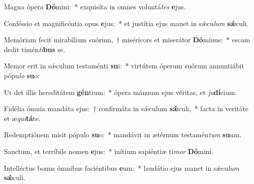 \item Magna ópera \textbf{Dó}mini:~* exquisíta in omnes voluntá\textit{tes} \textbf{e}jus.
\item Conféssio et magnificéntia opus \textbf{e}jus:~* et justítia ejus manet in sǽcu\textit{lum} \textbf{sǽ}culi.
\item Memóriam fecit mirabílium suórum,~† miséricors et miserátor \textbf{Dó}minus:~* escam dedit timén\textit{ti}\textbf{bus} se.
\item Memor erit in sǽculum testaménti \textbf{su}i:~* virtútem óperum suórum annuntiábit pópu\textit{lo} \textbf{su}o:
\item Ut det illis hereditátem \textbf{gén}tium:~* ópera mánuum ejus véritas, et \textit{ju}\textbf{dí}cium.
\item Fidélia ómnia mandáta ejus:~† confirmáta in sǽculum \textbf{sǽ}culi,~* facta in veritáte et æ\textit{qui}\textbf{tá}te.
\item Redemptiónem misit pópulo \textbf{su}o:~* mandávit in ætérnum testamén\textit{tum} \textbf{su}um.
\item Sanctum, et terríbile nomen \textbf{e}jus:~* inítium sapiéntiæ ti\textit{mor} \textbf{Dó}mini.
\item Intelléctus bonus ómnibus faciéntibus \textbf{e}um:~* laudátio ejus manet in sǽcu\textit{lum} \textbf{sǽ}culi.
